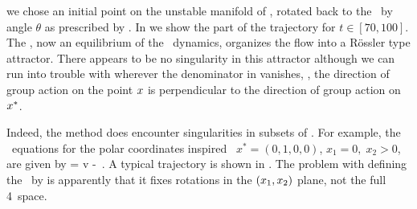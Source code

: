 we chose an initial point on the unstable manifold
of , rotated back to the \slice\ by angle $\theta$ as
prescribed by . In  we
show the part of the trajectory for $t\in\left[70,100\right]$.
The \reqv, now an equilibrium of the
\reducedsp\ dynamics, organizes the flow into a R\"ossler type
attractor. There appears to be no singularity in this
attractor although we can run into trouble with
 wherever the denominator in
 vanishes, \ie, the direction of group
action on the point $x$ is perpendicular to the direction
of group action on $x^*$.



Indeed, the method does encounter singularities in
subsets of \statesp.
For example, the \reducedsp\ equations 
for the polar coordinates inspired \slice\
$x^{*}=(0,1,0,0)$, $x_1=0,\;x_2>0$,
are given by
\beq
\dot{\ssp} = v -  \Lg \cdot \ssp
\,.
A typical trajectory is shown in .
The problem with defining the \slice\ by
 is apparently that it fixes rotations
in the $(x_1,x_2)$ plane, not the full 4\dmn\ space.



